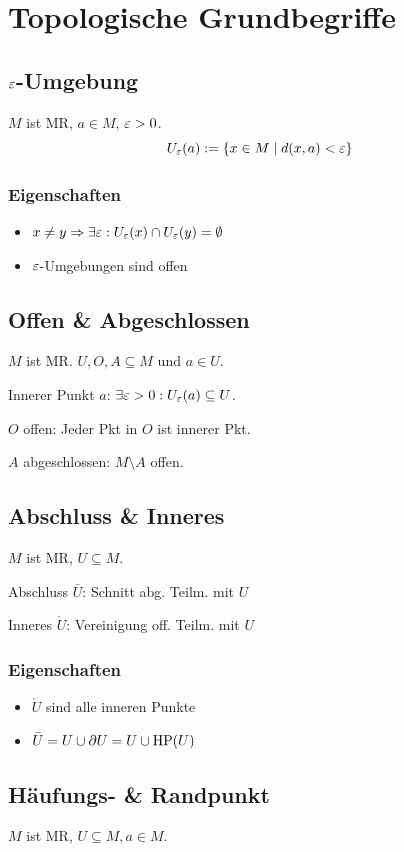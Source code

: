\section*{Topologische Grundbegriffe}

\subsection*{$\varepsilon$-Umgebung}
$M$ ist MR, $a\in M$, $\varepsilon > 0$.
\[U_\varepsilon(a) := \{x \in M \mid d(x,a) < \varepsilon\}\]
\subsubsection*{Eigenschaften}
\begin{itemize}
	\item $x \neq y \Rightarrow \exists \varepsilon: U_\varepsilon(x) \cap U_\varepsilon(y) = \emptyset$
	\item $\varepsilon$-Umgebungen sind offen
\end{itemize}

\subsection*{Offen \& Abgeschlossen}
$M$ ist MR. $U,O,A \subseteq M$ und $a \in U$.

Innerer Punkt $a$: $\exists \varepsilon>0: U_\varepsilon(a) \subseteq U$.

$O$ offen: Jeder Pkt in $O$ ist innerer Pkt.

$A$ abgeschlossen: $M \setminus A$ offen.

\subsection*{Abschluss \& Inneres}
$M$ ist MR, $U \subseteq M$.

Abschluss $\bar U$: Schnitt abg. Teilm. mit $U$

Inneres $\mathring U$: Vereinigung off. Teilm. mit $U$

\subsubsection*{Eigenschaften}
\begin{itemize}
	\item $\mathring U$ sind alle inneren Punkte
	\item $\bar U = U \cup \partial U = U \cup \operatorname{HP}(U)$
\end{itemize}

\subsection*{Häufungs- \& Randpunkt}
$M$ ist MR, $U \subseteq M, a \in M$.

